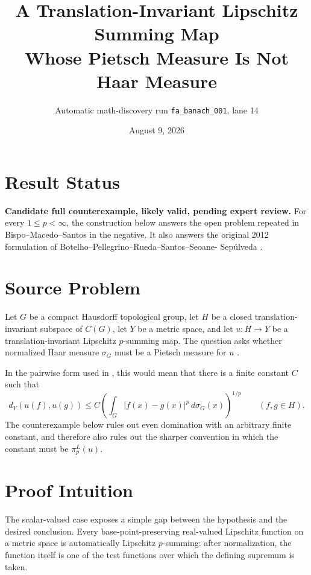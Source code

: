 \documentclass[11pt]{article}
\title{A Translation-Invariant Lipschitz Summing Map\\
Whose Pietsch Measure Is Not Haar Measure}
\author{Automatic math-discovery run \texttt{fa\_banach\_001}, lane 14}
\date{August 9, 2026}
\theoremstyle{definition}
\begin{document}
\maketitle

\section*{Result Status}

\textbf{Candidate full counterexample, likely valid, pending expert review.}
For every \(1\le p<\infty\), the construction below answers the open problem
repeated in Bispo--Macedo--Santos \cite{BMS} in the negative.  It also answers
the original 2012 formulation of Botelho--Pellegrino--Rueda--Santos--Seoane-
Sep\'ulveda \cite{BPRSS}.

\section{Source Problem}

Let \(G\) be a compact Hausdorff topological group, let \(H\) be a closed
translation-invariant subspace of \(C(G)\), let \(Y\) be a metric space, and
let \(u:H\to Y\) be a translation-invariant Lipschitz \(p\)-summing map.  The
question asks whether normalized Haar measure \(\sigma_G\) must be a Pietsch
measure for \(u\) \cite[p.~2, Introduction, Open Problem]{BMS}.

In the pairwise form used in \cite[Section 4]{BMS}, this would mean that there
is a finite constant \(C\) such that
\begin{equation}\label{eq:haar-domination}
 d_Y(u(f),u(g))
 \le C\left(\int_G |f(x)-g(x)|^p\,d\sigma_G(x)\right)^{1/p}
 \qquad(f,g\in H).
\end{equation}
The counterexample below rules out even domination with an arbitrary finite
constant, and therefore also rules out the sharper convention in which the
constant must be \(\pi_p^L(u)\).

\section{Proof Intuition}

The scalar-valued case exposes a simple gap between the hypothesis and the
desired conclusion.  Every base-point-preserving real-valued Lipschitz
function on a metric space is automatically Lipschitz \(p\)-summing: after
normalization, the function itself is one of the test functions over which
the defining supremum is taken.
\end{document}
